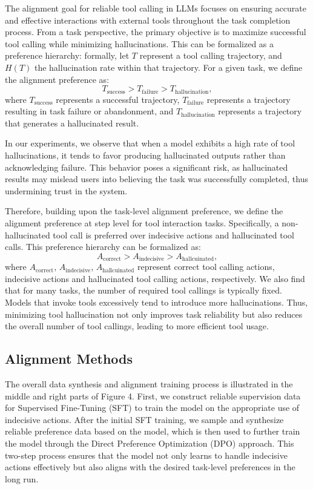 

% 
The alignment goal for reliable tool calling in LLMs focuses on ensuring accurate and effective interactions with external tools throughout the task completion process. From a task perspective, the primary objective is to maximize successful tool calling while minimizing hallucinations. This can be formalized as a preference hierarchy: formally, let $T$ represent a tool calling trajectory, and $H(T)$ the hallucination rate within that trajectory. For a given task, we define the alignment preference as:
$$
T_{\text{success}} > T_{\text{failure}} > T_{\text{hallucination}},
$$
where $T_{\text{success}}$ represents a successful trajectory, $T_{\text{failure}}$ represents a trajectory resulting in task failure or abandonment, and $T_{\text{hallucination}}$ represents a trajectory that generates a hallucinated result.

In our experiments, we observe that when a model exhibits a high rate of tool hallucinations, it tends to favor producing hallucinated outputs rather than acknowledging failure. This behavior poses a significant risk, as hallucinated results may mislead users into believing the task was successfully completed, thus undermining trust in the system.


Therefore, building upon the task-level alignment preference, we define the alignment preference at step level for tool interaction tasks. Specifically, a non-hallucinated tool call is preferred over indecisive actions and hallucinated tool calls. This preference hierarchy can be formalized as:
$$
A_{\text{correct}} > A_{\text{indecisive}} > A_{\text{hallcuinated}},
$$
where $A_{\text{correct}}$, $A_{\text{indecisive}}$, $A_{\text{hallcuinated}}$ represent correct tool calling actions, indecisive actions and hallucinated tool calling actions, respectively. We also find that for many tasks, the number of required tool callings is typically fixed. Models that invoke tools excessively tend to introduce more hallucinations. Thus, minimizing tool hallucination not only improves task reliability but also reduces the overall number of tool callings, leading to more efficient tool usage. 



\subsection{Alignment Methods}
\label{3.2}
The overall data synthesis and alignment training process is illustrated in the middle and right parts of Figure 4. First, we construct reliable supervision data for Supervised Fine-Tuning (SFT) to train the model on the appropriate use of indecisive actions. After the initial SFT training, we sample and synthesize reliable preference data based on the model, which is then used to further train the model through the Direct Preference Optimization (DPO) approach. This two-step process ensures that the model not only learns to handle indecisive actions effectively but also aligns with the desired task-level preferences in the long run.

